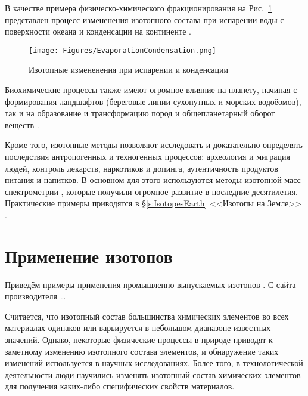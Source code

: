 \documentclass[a5paper,openany]{book}
\begin{document}
В качестве примера физическо-химического фракционирования на Рис.~\ref{f:EvaporationCondensation} представлен процесс измененения изотопного состава при испарении воды с поверхности океана и конденсации на континенте \cite{StableIsotopeDeltas}.
\begin{figure}[ht] 
	\centering\small
	\unitlength=1mm
	\texttt{[image: Figures/EvaporationCondensation.png]} 
	\caption{Изотопные измененения при испарении и конденсации \cite{StableIsotopeDeltas} }
	\label{f:EvaporationCondensation}
\end{figure}

Биохимические процессы также имеют огромное влияние на планету, начиная с формирования ландшафтов (береговые линии сухопутных и морских водоёомов), так и на образование и трансформацию пород и общепланетарный оборот веществ \cite{Zhuravlev2019}.  

Кроме того, изотопные методы позволяют исследовать и доказательно определять последствия антропогенных и техногенных процессов: археология и миграция людей, контроль лекарств, наркотиков и допинга, аутентичность продуктов питания и напитков. В основном для этого используются методы изотопной масс-спектрометрии \cite{ MS2013, Lebedev2003}, которые получили огромное развитие в последние десятилетия.
Практические примеры приводятся в  \S\ref{s:IsotopesEarth} <<Изотопы на Земле>> .

\section{Применение изотопов}\label{IsotopeApplications}

Приведём примеры применения промышленно выпускаемых изотопов \cite{isotopes-use}.
С сайта производителя \ldots

Считается, что изотопный состав большинства химических элементов во всех материалах одинаков или варьируется в небольшом диапазоне известных значений. Однако, некоторые физические процессы в природе приводят к заметному изменению изотопного состава элементов, и обнаружение таких изменений используется в научных исследованиях. Более того, в технологической деятельности люди научились изменять изотопный состав химических элементов для получения каких-либо специфических свойств материалов. 
\end{document}
